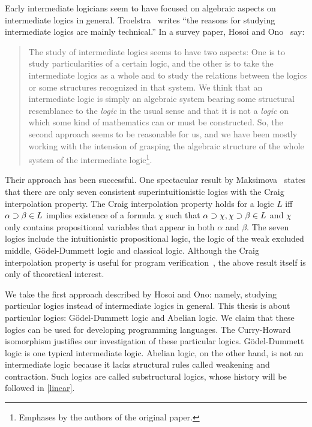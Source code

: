 Early intermediate logicians seem to have focused on algebraic aspects
on intermediate logics in general.
Troelstra~\cite[p.~223]{goedelcollected} writes ``the reasons
for studying intermediate logics are mainly technical.''
In a survey paper, Hosoi and Ono~\cite{hosoi-ono} say:
 \begin{quote}
  The study of intermediate logics seems to have two aspects: One is to
  study particularities of a certain logic, and the other is to take the
  intermediate logics as a whole and to study the relations between the
  logics or some structures recognized in that system.  We think that an
  intermediate logic is simply an algebraic system bearing some
  structural resemblance to the \textit{logic} in the usual sense and
  that it is not a \textit{logic} on which some kind of mathematics can
  or must be constructed.  So, the second approach seems to be
  reasonable for us, and we have been mostly working with the intension
  of grasping the algebraic structure of the whole system of the
  intermediate logic\footnote{Emphases by the authors of the original
  paper.}.
 \end{quote}
Their approach has been successful.
One spectacular result by Maksimova~\citep{maksimova77}
states that there are only seven consistent
superintuitionistic logics with the Craig interpolation
property.
The Craig interpolation property holds for a logic $L$ iff $\alpha
\supset\beta\in L$ implies existence of a formula $\chi$ such that
$\alpha\supset\chi, \chi\supset\beta\in L$ and $\chi$ only contains propositional
variables that appear in both $\alpha$ and $\beta$.
The seven logics include the intuitionistic propositional logic, the logic of
the weak excluded middle,
G\"odel-Dummett logic
and classical logic.
Although the Craig interpolation property is useful for program
verification~\citep{mcmillan2003,esparza,unno2009},
the above result itself is only of
theoretical interest.

We take the first approach described by Hosoi and Ono: namely,
studying particular logics instead of intermediate logics in general.
This thesis is about particular logics: G\"odel-Dummett logic and
Abelian logic.  We claim that these logics can be used for developing
 programming languages.  The Curry-Howard
isomorphism justifies our investigation of these particular logics.
G\"odel-Dummett logic is one typical intermediate logic.
Abelian logic, on the other hand, is not an intermediate logic
because it lacks structural rules called weakening and contraction.  Such logics are
called substructural logics, whose history will be followed in \ref{linear}.

